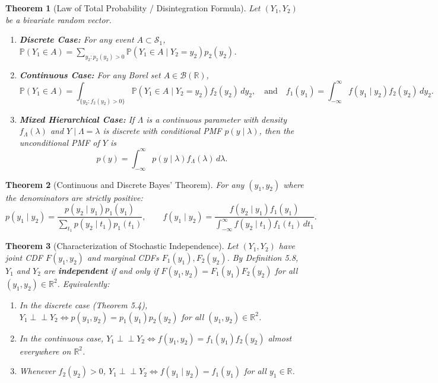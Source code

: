 \documentclass[11pt, letterpaper]{article}
\newtheorem{theorem}{Theorem}[section]
\theoremstyle{definition}
\theoremstyle{remark}
\newcommand{\Prob}{\mathbb{P}}
\begin{document}
\begin{theorem}[Law of Total Probability / Disintegration Formula]
Let $(Y_1, Y_2)$ be a bivariate random vector.
\begin{enumerate}[label=(\alph*)]
    \item \textbf{Discrete Case:} For any event $A \subset \mathcal{S}_1$, $\Prob(Y_1 \in A) = \sum_{y_2 : p_2(y_2) > 0} \Prob(Y_1 \in A \mid Y_2 = y_2) p_2(y_2)$.
    \item \textbf{Continuous Case:} For any Borel set $A \in \mathcal{B}(\mathbb{R})$,
    \[ \Prob(Y_1 \in A) = \int_{\{y_2 : f_2(y_2) > 0\}} \Prob(Y_1 \in A \mid Y_2 = y_2) f_2(y_2) \, dy_2, \quad \text{and} \quad f_1(y_1) = \int_{-\infty}^\infty f(y_1 \mid y_2) f_2(y_2) \, dy_2. \]
    \item \textbf{Mixed Hierarchical Case:} If $\Lambda$ is a continuous parameter with density $f_\Lambda(\lambda)$ and $Y \mid \Lambda = \lambda$ is discrete with conditional PMF $p(y \mid \lambda)$, then the unconditional PMF of $Y$ is
    \[ p(y) = \int_{-\infty}^\infty p(y \mid \lambda) f_\Lambda(\lambda) \, d\lambda. \]
\end{enumerate}
\end{theorem}

\begin{theorem}[Continuous and Discrete Bayes' Theorem]
For any $(y_1, y_2)$ where the denominators are strictly positive:
\[ p(y_1 \mid y_2) = \frac{p(y_2 \mid y_1) p_1(y_1)}{\sum_{t_1} p(y_2 \mid t_1) p_1(t_1)}, \qquad f(y_1 \mid y_2) = \frac{f(y_2 \mid y_1) f_1(y_1)}{\int_{-\infty}^\infty f(y_2 \mid t_1) f_1(t_1) \, dt_1}. \]
\end{theorem}

\begin{theorem}[Characterization of Stochastic Independence]
Let $(Y_1, Y_2)$ have joint CDF $F(y_1, y_2)$ and marginal CDFs $F_1(y_1), F_2(y_2)$. By Definition 5.8, $Y_1$ and $Y_2$ are \textbf{independent} if and only if $F(y_1, y_2) = F_1(y_1) F_2(y_2)$ for all $(y_1, y_2) \in \mathbb{R}^2$. Equivalently:
\begin{enumerate}[label=(\roman*)]
    \item In the discrete case (Theorem 5.4), $Y_1 \perp\!\!\!\perp Y_2 \iff p(y_1, y_2) = p_1(y_1) p_2(y_2)$ for all $(y_1, y_2) \in \mathbb{R}^2$.
    \item In the continuous case, $Y_1 \perp\!\!\!\perp Y_2 \iff f(y_1, y_2) = f_1(y_1) f_2(y_2)$ almost everywhere on $\mathbb{R}^2$.
    \item Whenever $f_2(y_2) > 0$, $Y_1 \perp\!\!\!\perp Y_2 \iff f(y_1 \mid y_2) = f_1(y_1)$ for all $y_1 \in \mathbb{R}$.
\end{enumerate}
\end{theorem}
\end{document}
